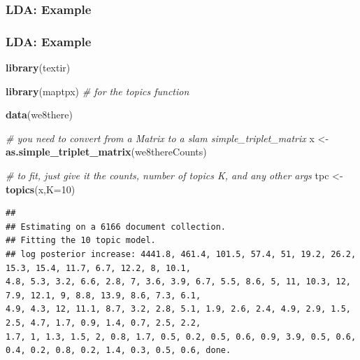 \documentclass[
  shownotes,
  xcolor={svgnames},
  hyperref={colorlinks,citecolor=DarkBlue,linkcolor=DarkRed,urlcolor=DarkBlue}
  , aspectratio=169]{beamer}
\newenvironment{Shaded}{\begin{snugshade}}{\end{snugshade}}
\newcommand{\CommentTok}[1]{\textcolor[rgb]{0.56,0.35,0.01}{\textit{#1}}}
\newcommand{\DataTypeTok}[1]{\textcolor[rgb]{0.13,0.29,0.53}{#1}}
\newcommand{\DecValTok}[1]{\textcolor[rgb]{0.00,0.00,0.81}{#1}}
\newcommand{\KeywordTok}[1]{\textcolor[rgb]{0.13,0.29,0.53}{\textbf{#1}}}
\newcommand{\NormalTok}[1]{#1}
\newcommand{\StringTok}[1]{\textcolor[rgb]{0.31,0.60,0.02}{#1}}
\begin{document}
\subsubsection{LDA: Example}
\begin{frame}[fragile]
\frametitle{LDA: Example}

\begin{scriptsize}

\begin{Shaded}
\begin{Highlighting}[]
\KeywordTok{library}\NormalTok{(textir)}

\KeywordTok{library}\NormalTok{(maptpx) }\CommentTok{\# for the topics function}

\KeywordTok{data}\NormalTok{(we8there)}

\CommentTok{\# you need to convert from a Matrix to a \textasciigrave{}slam\textquotesingle{} simple\_triplet\_matrix}
\NormalTok{x \textless{}{-}}\StringTok{ }\KeywordTok{as.simple\_triplet\_matrix}\NormalTok{(we8thereCounts)}

\CommentTok{\# to fit, just give it the counts, number of \textasciigrave{}topics\textquotesingle{} K, and any other args}
\NormalTok{tpc \textless{}{-}}\StringTok{ }\KeywordTok{topics}\NormalTok{(x,}\DataTypeTok{K=}\DecValTok{10}\NormalTok{) }
\end{Highlighting}
\end{Shaded}
\end{scriptsize}
\begin{tiny}



\begin{verbatim}
## 
## Estimating on a 6166 document collection.
## Fitting the 10 topic model.
## log posterior increase: 4441.8, 461.4, 101.5, 57.4, 51, 19.2, 26.2, 15.3, 15.4, 11.7, 6.7, 12.2, 8, 10.1, 
4.8, 5.3, 3.2, 6.6, 2.8, 7, 3.6, 3.9, 6.7, 5.5, 8.6, 5, 11, 10.3, 12, 7.9, 12.1, 9, 8.8, 13.9, 8.6, 7.3, 6.1, 
4.9, 4.3, 12, 11.1, 8.7, 3.2, 2.8, 5.1, 1.9, 2.6, 2.4, 4.9, 2.9, 1.5, 2.5, 4.7, 1.7, 0.9, 1.4, 0.7, 2.5, 2.2, 
1.7, 1, 1.3, 1.5, 2, 0.8, 1.7, 0.5, 0.2, 0.5, 0.6, 0.9, 3.9, 0.5, 0.6, 0.4, 0.2, 0.8, 0.2, 1.4, 0.3, 0.5, 0.6, done.
\end{verbatim}
\end{tiny}
\end{frame}
\end{document}
